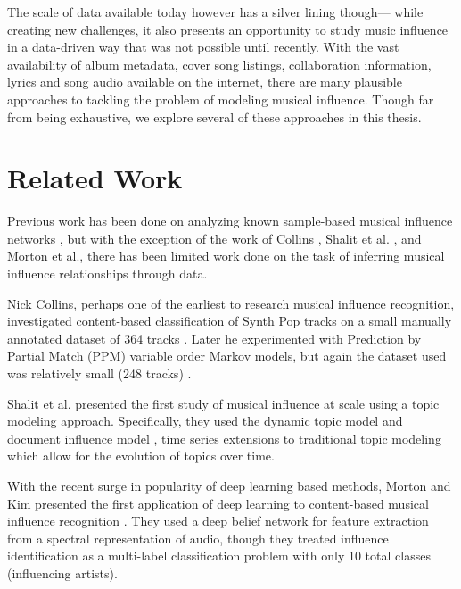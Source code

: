 The scale of data available today however has a silver lining though--- while creating new challenges, it also presents an opportunity to study music influence in a data-driven way that was not possible until recently. With the vast availability of album metadata, cover song listings, collaboration information, lyrics and song audio available on the internet, there are many plausible approaches to tackling the problem of modeling musical influence. Though far from being exhaustive, we explore several of these approaches in this thesis.

\section{Related Work}
Previous work has been done on analyzing known sample-based musical influence networks \cite{bryan2011musical}, but with the exception of the work of Collins \cite{collins2010computational, collins2012influence}, Shalit et al. \cite{shalit2013modeling}, and Morton et al.\cite{morton2015acoustic}, there has been limited work done on the task of inferring musical influence relationships through data.

Nick Collins, perhaps one of the earliest to research musical influence recognition, investigated content-based classification of Synth Pop tracks on a small manually annotated dataset of 364 tracks \cite{collins2010computational}. Later he experimented with Prediction by Partial Match (PPM) variable order Markov models, but again the dataset used was relatively small (248 tracks) \cite{collins2012influence}. 

Shalit et al. \cite{shalit2013modeling} presented the first study of musical influence at scale using a topic modeling approach. Specifically, they used the dynamic topic model \cite{blei2006dynamic} and document influence model \cite{gerrish2010language}, time series extensions to traditional topic modeling which allow for the evolution of topics over time. 

With the recent surge in popularity of deep learning based methods, Morton and Kim presented the first application of deep learning to content-based musical influence recognition \cite{morton2015acoustic}. They used a deep belief network for feature extraction from a spectral representation of audio, though they treated influence identification as a multi-label classification problem with only 10 total classes (influencing artists).

